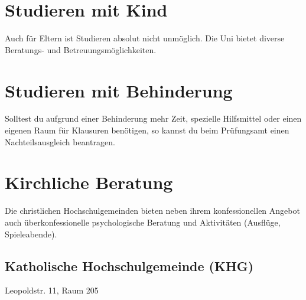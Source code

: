 \begin{urlList}
\end{urlList}

\section{Studieren mit Kind}

Auch für Eltern ist Studieren absolut nicht unmöglich. Die Uni bietet diverse Beratungs- und Betreuungsmöglichkeiten.

\begin{urlList}
\end{urlList}

\section{Studieren mit Behinderung}

Solltest du aufgrund einer Behinderung mehr Zeit, spezielle Hilfsmittel oder einen eigenen Raum für Klausuren benötigen, so kannst du beim Prüfungsamt einen Nachteilsausgleich beantragen.

\begin{urlList}
\end{urlList}



\section{Kirchliche Beratung}
Die christlichen Hochschulgemeinden bieten neben ihrem konfessionellen Angebot auch überkonfessionelle psychologische Beratung und Aktivitäten (Ausflüge, Spieleabende).
\newpage
\subsection*{Katholische Hochschulgemeinde (KHG)}
Leopoldstr. 11, Raum 205

\begin{urlList}
\end{urlList}

